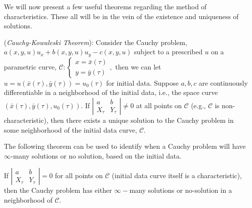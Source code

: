 We will now present a few useful theorems regarding the method of characteristics. These all will be in the vein of the existence and uniqueness of solutions. 

\begin{theorem}
(\emph{Cauchy-Kowaleski Theorem}): Consider the Cauchy problem, $a(x,y,u) u_x + b(x,y,u) u_y - c(x,y,u)$ subject to a prescribed $u$ on a parametric curve, $\mathscr{C}: \left\{ \begin{array}{c} x = \bar{x}(\tau) \\ y=\bar{y}(\tau) \end{array} \right.,$ then we can let $u=u(\bar{x}(\tau),\bar{y}(\tau) )=u_0(\tau)$ for initial data. Suppose $a,b,c$ are continuously differentiable in a neighborhood of the initial data, i.e., the space curve $(\bar{x}(\tau), \bar{y}(\tau), u_0(\tau)).$ If 
$\left| \begin{array}{cc} a & b \\ X_\tau &Y_\tau \end{array}\right| \neq 0$ at all points on $\mathscr{C}$ (e.g., $\mathscr{C}$ is non-characteristic), then there exists a unique solution to the Cauchy problem in some neighborhood of the initial data curve, $\mathscr{C}.$
\end{theorem}

The following theorem can be used to identify when a Cauchy problem will have $\infty$-many solutions or no solution, based on the initial data.

\begin{theorem}
If $\left| \begin{array}{cc} a & b \\ X_\tau & Y_\tau \end{array}\right| = 0$ for all points on $\mathscr{C}$ (initial data curve itself is a characteristic), then the Cauchy problem has either $\infty-$many solutions or no-solution in a neighborhood of $\mathscr{C}.$
\end{theorem}

